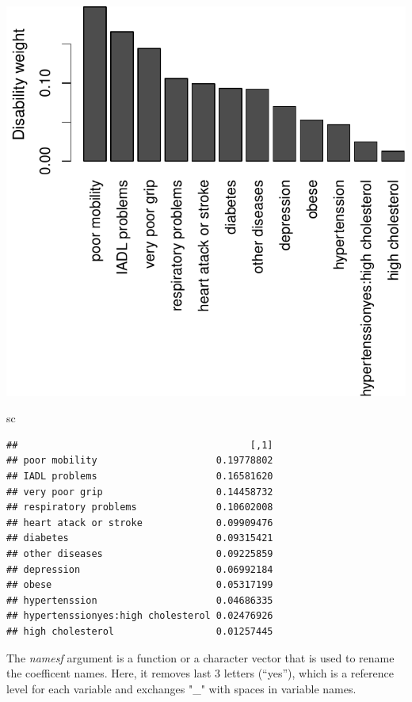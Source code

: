 \documentclass[]{article}
\newenvironment{Shaded}{\begin{snugshade}}{\end{snugshade}}
\newcommand{\NormalTok}[1]{#1}
\begin{document}
\begin{center}\includegraphics{vignette_files/figure-latex/unnamed-chunk-15-1} \end{center}

\begin{Shaded}
\begin{Highlighting}[]
\NormalTok{sc}
\end{Highlighting}
\end{Shaded}

\begin{verbatim}
##                                         [,1]
## poor mobility                     0.19778802
## IADL problems                     0.16581620
## very poor grip                    0.14458732
## respiratory problems              0.10602008
## heart atack or stroke             0.09909476
## diabetes                          0.09315421
## other diseases                    0.09225859
## depression                        0.06992184
## obese                             0.05317199
## hypertenssion                     0.04686335
## hypertenssionyes:high cholesterol 0.02476926
## high cholesterol                  0.01257445
\end{verbatim}

The \emph{namesf} argument is a function or a character vector that is
used to rename the coefficent names. Here, it removes last 3 letters
(``yes''), which is a reference level for each variable and exchanges
"\_" with spaces in variable names.
\end{document}
